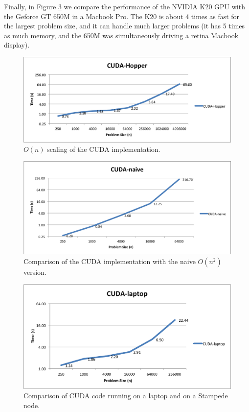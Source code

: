 \documentclass{article}
\begin{document}
Finally, in Figure \ref{fig:gpu-laptop} we compare the performance of the NVIDIA K20 GPU with the Geforce GT 650M in a Macbook Pro.  The K20 is about 4 times as fast for the largest problem size, and it can handle much larger problems (it has 5 times as much memory, and the 650M was simultaneously driving a retina Macbook display).

\begin{figure}
  \includegraphics[width=\textwidth]{plots/CUDA-hopper.png}
  \caption{$O(n)$ scaling of the CUDA implementation.}
  \label{fig:gpu-on}
\end{figure}

\begin{figure}
  \includegraphics[width=\textwidth]{plots/CUDA-naive.png}
  \caption{Comparison of the CUDA implementation with the naive $O(n^2)$ version.}
  \label{fig:gpu-naive}
\end{figure}

\begin{figure}
  \includegraphics[width=\textwidth]{plots/CUDA-laptop.png}
  \caption{Comparison of CUDA code running on a laptop and on a Stampede node.}
  \label{fig:gpu-laptop}
\end{figure}
\end{document}
